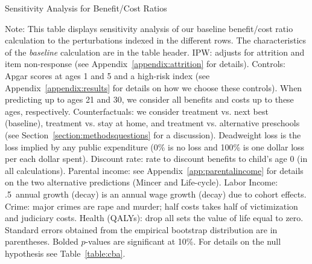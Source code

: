 \begin{table}
\begin{threeparttable}
\caption{Sensitivity Analysis for Benefit/Cost Ratios}
\label{table:bcsens}
\centering
\footnotesize

\begin{tablenotes}
\footnotesize
\item Note: This table displays sensitivity analysis of our baseline benefit/cost ratio calculation to the perturbations indexed in the different rows. The characteristics of the \textit{baseline} calculation are in the table header. IPW: adjusts for attrition and item non-response (see Appendix~\ref{appendix:attrition} for details). Controls: Apgar scores at ages 1 and 5 and a high-risk index (see Appendix~\ref{appendix:results} for details on how we choose these controls). When predicting up to ages 21 and 30, we consider all benefits and costs up to these ages, respectively. Counterfactuals: we consider treatment vs. next best (baseline), treatment vs. stay at home, and treatment vs. alternative preschools (see Section~\ref{section:methodsquestions} for a discussion). Deadweight loss is the loss implied by any public expenditure (0\% is no loss and 100\% is one dollar loss per each dollar spent). Discount rate: rate to discount benefits to child's age 0 (in all calculations). Parental income: see Appendix~\ref{app:parentalincome} for details on the two alternative predictions (Mincer and Life-cycle). Labor Income: .5\ annual growth (decay) is an annual wage growth (decay) due to cohort effects. Crime: major crimes are rape and murder; half costs takes half of victimization and judiciary costs. Health (QALYs): drop all sets the value of life equal to zero. Standard errors obtained from the empirical bootstrap distribution are in parentheses. Bolded $p$-values are significant at 10\%. For details on the null hypothesis see Table~\ref{table:cba}.
\end{tablenotes}
\end{threeparttable}
\end{table}

